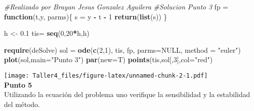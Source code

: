 \documentclass[]{article}
\newenvironment{Shaded}{\begin{snugshade}}{\end{snugshade}}
\newcommand{\KeywordTok}[1]{\textcolor[rgb]{0.13,0.29,0.53}{\textbf{#1}}}
\newcommand{\DataTypeTok}[1]{\textcolor[rgb]{0.13,0.29,0.53}{#1}}
\newcommand{\DecValTok}[1]{\textcolor[rgb]{0.00,0.00,0.81}{#1}}
\newcommand{\FloatTok}[1]{\textcolor[rgb]{0.00,0.00,0.81}{#1}}
\newcommand{\StringTok}[1]{\textcolor[rgb]{0.31,0.60,0.02}{#1}}
\newcommand{\CommentTok}[1]{\textcolor[rgb]{0.56,0.35,0.01}{\textit{#1}}}
\newcommand{\OtherTok}[1]{\textcolor[rgb]{0.56,0.35,0.01}{#1}}
\newcommand{\ControlFlowTok}[1]{\textcolor[rgb]{0.13,0.29,0.53}{\textbf{#1}}}
\newcommand{\OperatorTok}[1]{\textcolor[rgb]{0.81,0.36,0.00}{\textbf{#1}}}
\newcommand{\NormalTok}[1]{#1}
\begin{document}
\begin{Shaded}
\begin{Highlighting}[]
\CommentTok{#Realizado por Brayan Jesus Gonzalez Aguilera}
\CommentTok{#Solucion Punto 3}
\NormalTok{fp =}\StringTok{ }\ControlFlowTok{function}\NormalTok{(t,y, parms)\{}
\NormalTok{  s =}\StringTok{ }\NormalTok{y }\OperatorTok{-}\StringTok{ }\NormalTok{t }\OperatorTok{-}\StringTok{ }\DecValTok{1}
  \KeywordTok{return}\NormalTok{(}\KeywordTok{list}\NormalTok{(s))}
\NormalTok{\}}

\NormalTok{h <-}\StringTok{ }\FloatTok{0.1}
\NormalTok{tis=}\StringTok{ }\KeywordTok{seq}\NormalTok{(}\DecValTok{0}\NormalTok{,}\DecValTok{20}\OperatorTok{*}\NormalTok{h,h)}

\KeywordTok{require}\NormalTok{(deSolve)}
\NormalTok{sol =}\StringTok{ }\KeywordTok{ode}\NormalTok{(}\KeywordTok{c}\NormalTok{(}\DecValTok{2}\NormalTok{,}\DecValTok{1}\NormalTok{), tis, fp, }\DataTypeTok{parms=}\OtherTok{NULL}\NormalTok{, }\DataTypeTok{method =} \StringTok{"euler"}\NormalTok{)}
\KeywordTok{plot}\NormalTok{(sol,}\DataTypeTok{main=}\StringTok{"Punto 3"}\NormalTok{)}
\KeywordTok{par}\NormalTok{(}\DataTypeTok{new=}\NormalTok{T)}
\KeywordTok{points}\NormalTok{(tis,sol[,}\DecValTok{3}\NormalTok{],}\DataTypeTok{col=}\StringTok{"red"}\NormalTok{)}
\end{Highlighting}
\end{Shaded}

\texttt{[image: Taller4\_files/figure-latex/unnamed-chunk-2-1.pdf]}\\
\textbf{Punto 5}\\[2\baselineskip]Utilizando la ecuación del problema
uno verifique la sensibilidad y la estabilidad del método.
\end{document}
